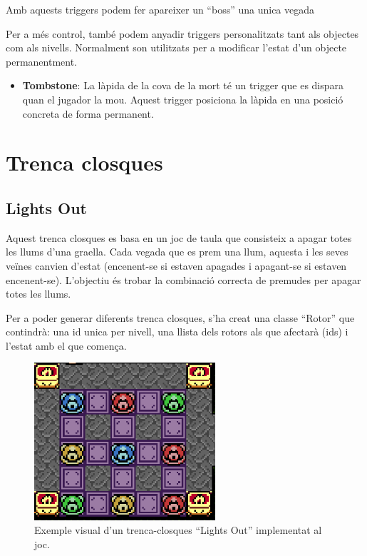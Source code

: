 \documentclass[a4paper,12pt]{article}
\begin{document}
Amb aquests triggers podem fer apareixer un ``boss'' una unica vegada

Per a més control, també podem anyadir triggers personalitzats tant als objectes com als nivells. Normalment son utilitzats per a modificar l'estat d'un objecte permanentment.
\begin{itemize}
    \item \textbf{Tombstone}: La làpida de la cova de la mort té un trigger que es dispara quan el jugador la mou. Aquest trigger posiciona la làpida en una posició concreta de forma permanent.
\end{itemize} 

\section{Trenca closques}

\subsection{Lights Out}
Aquest trenca closques es basa en un joc de taula que consisteix a apagar totes les llums d'una graella. Cada vegada que es prem una llum, aquesta i les seves veïnes canvien d'estat (encenent-se si estaven apagades i apagant-se si estaven encenent-se). L'objectiu és trobar la combinació correcta de premudes per apagar totes les llums. 

Per a poder generar diferents trenca closques, s'ha creat una classe ``Rotor'' que contindrà: una id unica per nivell, una llista dels rotors als que afectarà (ids) i l'estat amb el que comença.

\begin{figure}[ht!]
    \centering
    \includegraphics[width=0.6\textwidth]{../imgs/exemple-trencaclosques.png}
    \caption{Exemple visual d'un trenca-closques ``Lights Out'' implementat al joc.}
    \label{fig:exemple-trencaclosques}
\end{figure}
\end{document}

